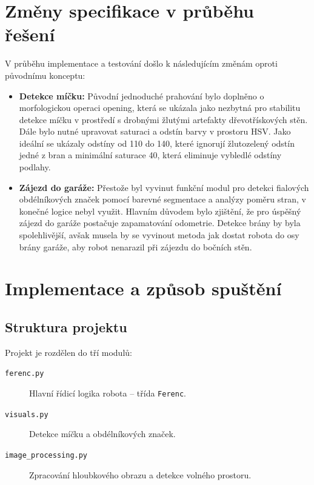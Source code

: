 \documentclass[12pt, a4paper, oneside]{article}
\begin{document}
\section{Změny specifikace v průběhu řešení}
\label{sec:zmeny}

V průběhu implementace a testování došlo k následujícím změnám oproti původnímu konceptu:

\begin{itemize}
  \item \textbf{Detekce míčku:} Původní jednoduché prahování bylo doplněno o morfologickou operaci opening, která se ukázala jako nezbytná pro stabilitu detekce míčku v prostředí s drobnými žlutými artefakty dřevotřískových stěn. Dále bylo nutné upravovat saturaci a odstín barvy v prostoru HSV. Jako ideální se ukázaly odstíny od 110 do 140, které ignorují žlutozelený odstín jedné z bran a minimální saturace 40, která eliminuje vybledlé odstíny podlahy.
  \item \textbf{Zájezd do garáže:} Přestože byl vyvinut funkční modul pro detekci fialových obdélníkových značek pomocí barevné segmentace a analýzy poměru stran, v konečné logice nebyl využit. Hlavním důvodem bylo zjištění, že pro úspěšný zájezd do garáže postačuje zapamatování odometrie. Detekce brány by byla spolehlivější, avšak musela by se vyvinout metoda jak dostat robota do osy brány garáže, aby robot nenarazil při zájezdu do bočních stěn.
\end{itemize}

\section{Implementace a způsob spuštění}
\label{sec:implementace}

\subsection{Struktura projektu}

Projekt je rozdělen do tří modulů:

\begin{description}
  \item[\texttt{ferenc.py}] Hlavní řídicí logika robota – třída \texttt{Ferenc}.
  \item[\texttt{visuals.py}] Detekce míčku a obdélníkových značek.
  \item[\texttt{image\_processing.py}] Zpracování hloubkového obrazu a detekce volného prostoru.
\end{description}
\end{document}
